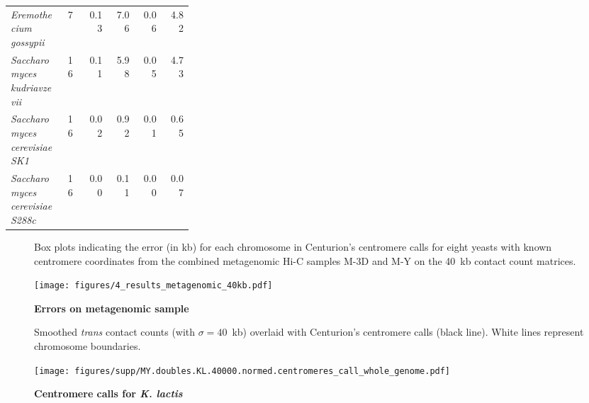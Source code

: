 \begin{table}[ht!]
\begin{center}
\begin{tabular}{p{0.3\linewidth} | c | r | r | r | r}
\footnotesize{\textit{Eremothecium gossypii}} & \footnotesize{7} & 0.13 & 7.06 & 0.06 & 4.82 \\
\footnotesize{\textit{Saccharomyces kudriavzevii}} & \footnotesize{16} & 0.11 & 5.98 & 0.05 & 4.73 \\
\footnotesize{\textit{Saccharomyces cerevisiae SK1}} & \footnotesize{16} & 0.02 & 0.92 & 0.01 & 0.65 \\
\footnotesize{\textit{Saccharomyces cerevisiae S288c}} & \footnotesize{16} & 0.00 & 0.11 & 0.00 & 0.07 \\
\end{tabular}
\end{center}
\label{supptable:my_qc}
\end{table}

\clearpage

\begin{figure}[ht!]
\caption{\textbf{Errors on metagenomic sample}}{
Box plots indicating the error (in kb) for each chromosome in
Centurion's centromere calls for eight yeasts with known centromere
coordinates from the combined metagenomic Hi-C samples M-3D and M-Y
on the 40~kb contact count matrices.
}
\begin{center}
\texttt{[image: figures/4\_results\_metagenomic\_40kb.pdf]}
\end{center}
\label{suppfig:metagenomic_sample_40}
\end{figure}



\clearpage

\begin{figure}[ht!]
\caption{\textbf{Centromere calls for \textit{K. lactis}}}{
Smoothed \textit{trans} contact counts (with $\sigma=40$~kb) overlaid with
Centurion's centromere calls (black line). White lines represent chromosome
boundaries.
}
\begin{center}
\texttt{[image: figures/supp/MY.doubles.KL.40000.normed.centromeres\_call\_whole\_genome.pdf]}
\end{center}
\label{suppfig:KL_calls}
\end{figure}

